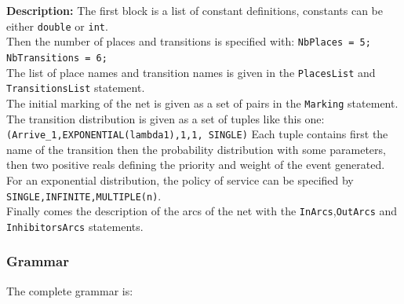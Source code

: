 \documentclass{article}
\begin{document}
{\bf Description:}
The first block is a list of constant definitions, constants can be
either \verb|double| or \verb|int|.\\
Then the number of places and transitions is specified with:
\verb|NbPlaces = 5; NbTransitions = 6;|\\
The list of place names and transition names is given in the
\verb|PlacesList| and \verb|TransitionsList| statement.\\
The initial marking of the net is given as a set of pairs
in the \verb|Marking| statement.\\
The transition distribution is given as a set of tuples like
this one:\\ \verb|(Arrive_1,EXPONENTIAL(lambda1),1,1, SINGLE)|
Each tuple contains first the name of the transition then
the probability distribution with some parameters, then two positive
reals defining the priority and weight of the event generated.
For an exponential distribution,  the policy of service can be specified
by \verb|SINGLE,INFINITE,MULTIPLE(n)|.\\
Finally comes the description of the arcs of the net with the 
\verb|InArcs|,\verb|OutArcs| and \verb|InhibitorsArcs| statements.


\subsubsection{Grammar}
The complete grammar is:
\end{document}
